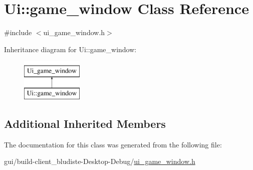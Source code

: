 \hypertarget{classUi_1_1game__window}{\section{Ui\-:\-:game\-\_\-window Class Reference}
\label{classUi_1_1game__window}
}


{\ttfamily \#include $<$ui\-\_\-game\-\_\-window.\-h$>$}

Inheritance diagram for Ui\-:\-:game\-\_\-window\-:\begin{figure}[H]
\begin{center}
\leavevmode
\includegraphics[height=2.000000cm]{classUi_1_1game__window}
\end{center}
\end{figure}
\subsection*{Additional Inherited Members}


The documentation for this class was generated from the following file\-:\begin{DoxyCompactItemize}
\item 
gui/build-\/client\-\_\-bludiste-\/\-Desktop-\/\-Debug/\hyperlink{ui__game__window_8h}{ui\-\_\-game\-\_\-window.\-h}\end{DoxyCompactItemize}
